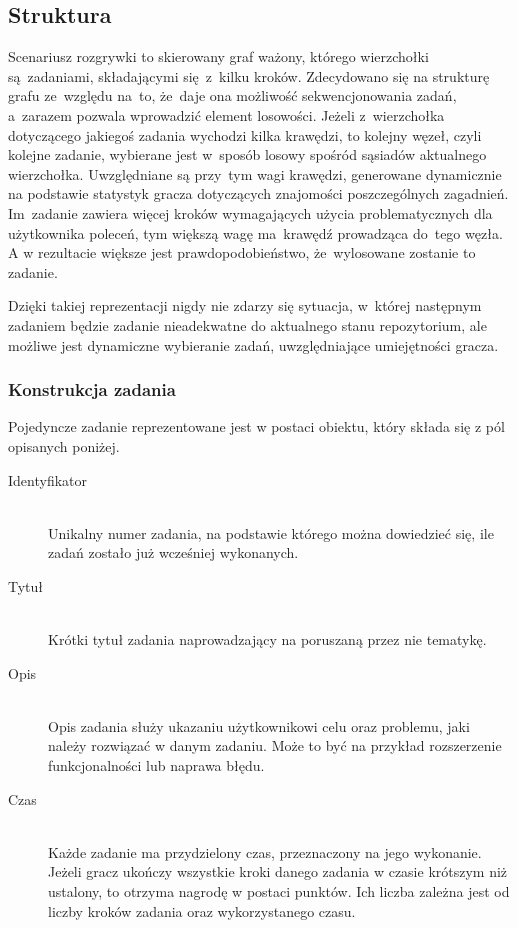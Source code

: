 \documentclass[12pt,a4paper,polish,thesis]{dcsbook}
\begin{document}
{	\subsection{Struktura} \label{Struktura}

	Scenariusz rozgrywki to skierowany graf ważony, którego wierzchołki są~zadaniami, składającymi się~z~kilku kroków. Zdecydowano się na strukturę grafu ze~względu na~to, że~daje ona możliwość sekwencjonowania zadań, a~zarazem pozwala wprowadzić element losowości. Jeżeli z~wierzchołka dotyczącego jakiegoś zadania wychodzi kilka krawędzi, to kolejny węzeł, czyli kolejne zadanie, wybierane jest w~sposób losowy spośród sąsiadów aktualnego wierzchołka. Uwzględniane są przy~tym wagi krawędzi, generowane dynamicznie na podstawie statystyk gracza dotyczących znajomości poszczególnych zagadnień. Im~zadanie zawiera więcej kroków wymagających użycia problematycznych dla użytkownika poleceń, tym większą wagę ma~krawędź prowadząca do~tego węzła. A w rezultacie większe jest prawdopodobieństwo, że~wylosowane zostanie to zadanie.
	
	Dzięki takiej reprezentacji nigdy nie zdarzy się sytuacja, w~której następnym zadaniem będzie zadanie nieadekwatne do aktualnego stanu repozytorium, ale możliwe jest dynamiczne wybieranie zadań, uwzględniające umiejętności gracza.

	\subsubsection{Konstrukcja zadania}
	Pojedyncze zadanie reprezentowane jest w postaci obiektu, który składa się z pól opisanych poniżej.
	\begin{description}
	\item[Identyfikator] \hfill \\
		Unikalny numer zadania, na podstawie którego można dowiedzieć się, ile zadań zostało już wcześniej wykonanych.
		
	\item[Tytuł] \hfill \\
		Krótki tytuł zadania naprowadzający na poruszaną przez nie tematykę.
	
	\item[Opis] \hfill \\
		Opis zadania służy ukazaniu użytkownikowi celu oraz problemu, jaki należy rozwiązać w danym zadaniu. Może to być na przykład rozszerzenie funkcjonalności lub naprawa błędu.
		
	\item[Czas] \hfill \\
		Każde zadanie ma przydzielony czas, przeznaczony na jego wykonanie. Jeżeli gracz ukończy wszystkie kroki danego zadania w czasie krótszym niż ustalony, to otrzyma nagrodę w postaci punktów. Ich liczba zależna jest od liczby kroków zadania oraz wykorzystanego czasu.	
	

\end{description}}
\end{document}
